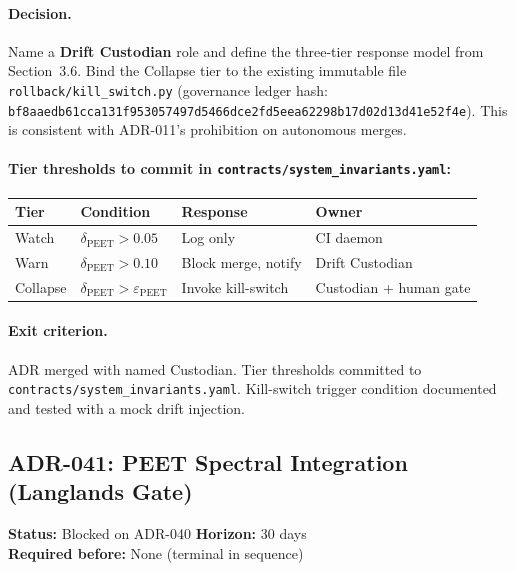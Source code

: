 \documentclass[11pt,letterpaper]{article}
\theoremstyle{definition}
\theoremstyle{remark}
\newcommand{\peet}{\mathrm{PEET}}
\begin{document}
\paragraph{Decision.}
Name a \textbf{Drift Custodian} role and define the three-tier
response model from Section~3.6. Bind the Collapse tier to the
existing immutable file \texttt{rollback/kill\_switch.py}
(governance ledger hash:
\texttt{bf8aaedb61cca131f953057497d5466dce2fd5eea62298b17d02d13d41e52f4e}).
This is consistent with ADR-011's prohibition on autonomous merges.

\paragraph{Tier thresholds to commit in \texttt{contracts/system\_invariants.yaml}:}

\begin{center}
\begin{tabular}{llll}
\toprule
\textbf{Tier} & \textbf{Condition} & \textbf{Response} & \textbf{Owner} \\
\midrule
Watch    & \(\delta_{\peet} > 0.05\)              & Log only            & CI daemon \\
Warn     & \(\delta_{\peet} > 0.10\)              & Block merge, notify & Drift Custodian \\
Collapse & \(\delta_{\peet} > \varepsilon_{\peet}\) & Invoke kill-switch  & Custodian + human gate \\
\bottomrule
\end{tabular}
\end{center}

\paragraph{Exit criterion.}
ADR merged with named Custodian. Tier thresholds committed to
\texttt{contracts/system\_invariants.yaml}. Kill-switch trigger
condition documented and tested with a mock drift injection.

\subsection{ADR-041: PEET Spectral Integration (Langlands Gate)}

\begin{mdframed}[linecolor=blue!40,linewidth=1pt,backgroundcolor=blue!2]
\textbf{Status:} Blocked on ADR-040 \quad
\textbf{Horizon:} 30 days \\
\textbf{Required before:} None (terminal in sequence)
\end{mdframed}
\end{document}
